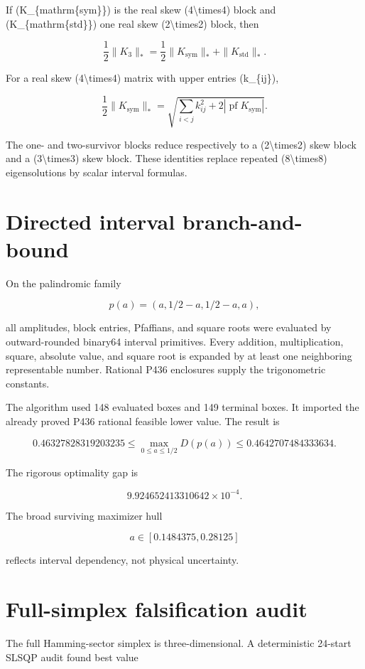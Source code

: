 \documentclass[11pt,a4paper,openany]{report}
\begin{document}
If (K\_\{mathrm\{sym\}\}) is the real skew (4\textbackslash{}times4) block and (K\_\{mathrm\{std\}\}) one real skew (2\textbackslash{}times2) block, then

\[
\frac12\|K_3\|_*
=\frac12\|K_{\mathrm{sym}}\|_*
+\|K_{\mathrm{std}}\|_*.
\]

For a real skew (4\textbackslash{}times4) matrix with upper entries (k\_\{ij\}),

\[
\frac12\|K_{\mathrm{sym}}\|_*
=\sqrt{
\sum_{i<j}k_{ij}^2
+2|\operatorname{pf}K_{\mathrm{sym}}|
}.
\]

The one- and two-survivor blocks reduce respectively to a (2\textbackslash{}times2) skew block and a (3\textbackslash{}times3) skew block. These identities replace repeated (8\textbackslash{}times8) eigensolutions by scalar interval formulas.

\section{Directed interval branch-and-bound}

On the palindromic family

\[
p(a)=(a,1/2-a,1/2-a,a),
\]

all amplitudes, block entries, Pfaffians, and square roots were evaluated by outward-rounded binary64 interval primitives. Every addition, multiplication, square, absolute value, and square root is expanded by at least one neighboring representable number. Rational P436 enclosures supply the trigonometric constants.

The algorithm used 148 evaluated boxes and 149 terminal boxes. It imported the already proved P436 rational feasible lower value. The result is

\[
0.46327828319203235
\le
\max_{0\le a\le1/2}D(p(a))
\le
0.4642707484333634.
\]

The rigorous optimality gap is

\[
9.924652413310642\times10^{-4}.
\]

The broad surviving maximizer hull

\[
a\in[0.1484375,0.28125]
\]

reflects interval dependency, not physical uncertainty.

\section{Full-simplex falsification audit}

The full Hamming-sector simplex is three-dimensional. A deterministic 24-start SLSQP audit found best value
\end{document}
